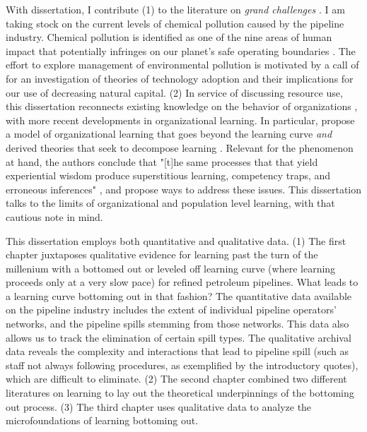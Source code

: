 With dissertation, I contribute (1) to the literature on \textit{grand challenges} \citep{George2016}. I am taking stock on the current levels of chemical pollution caused by the pipeline industry. Chemical pollution is identified as one of the nine areas of human impact that potentially infringes on our planet's safe operating boundaries \citep{Rockstrom2009a}. The effort to explore management of environmental pollution is motivated by a call of \citet{George2015} for an investigation of theories of technology adoption and their implications for our use of decreasing natural capital. (2) In service of discussing resource use, this dissertation reconnects existing knowledge on the behavior of organizations \citep{March1963}, with more recent developments in organizational learning. In particular, \citet{Levitt1988} propose a model of organizational learning that goes beyond the learning curve \textit{and} derived theories that seek to decompose learning \citep[e.g.,][p. 2]{Argote2013-1}. Relevant for the phenomenon at hand, the authors conclude that "[t]he same processes that that yield experiential wisdom produce superstitious learning, competency traps, and erroneous inferences" \citep[p. 335]{Levitt1988}, and propose ways to address these issues. This dissertation talks to the limits of organizational and population level learning, with that cautious note in mind.

This dissertation employs both quantitative and qualitative data. (1) The first chapter juxtaposes qualitative evidence for learning past the turn of the millenium with a bottomed out or leveled off learning curve (where learning proceeds only at a very slow pace) for refined petroleum pipelines. What leads to a learning curve bottoming out in that fashion? The quantitative data available on the pipeline industry includes the extent of individual pipeline operators' networks, and the pipeline spills stemming from those networks. This data also allows us to track the elimination of certain spill types. The qualitative archival data reveals the complexity and interactions that lead to pipeline spill (such as staff not always following procedures, as exemplified by the introductory quotes), which are difficult to eliminate. (2) The second chapter combined two different literatures on learning to lay out the theoretical underpinnings of the bottoming out process. (3) The third chapter uses qualitative data to analyze the microfoundations of learning bottoming out.
